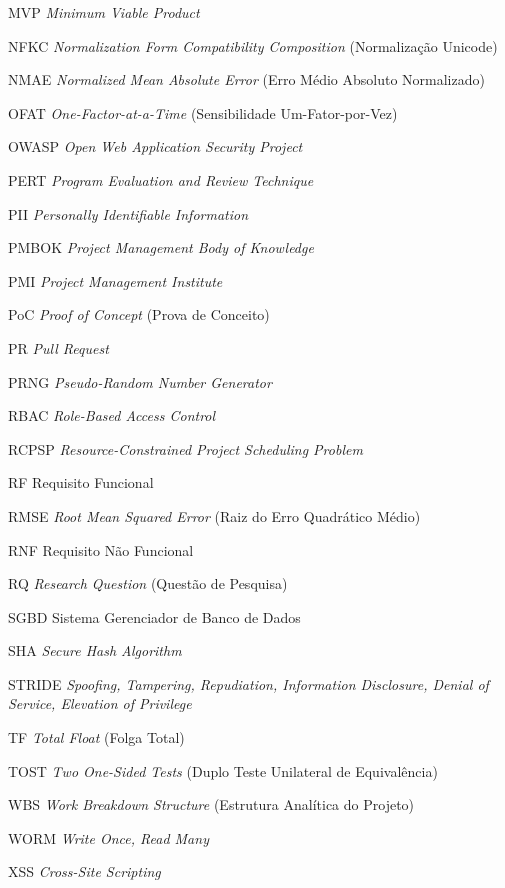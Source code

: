 \documentclass[12pt,openany,oneside,a4paper,english,brazilian,sumario=tradicional]{abntex2}
\begin{document}
\begin{siglas}
  \item[MVP] \textit{Minimum Viable Product}
  \item[NFKC] \textit{Normalization Form Compatibility Composition} (Normalização Unicode)
  \item[NMAE] \textit{Normalized Mean Absolute Error} (Erro Médio Absoluto Normalizado)
  \item[OFAT] \textit{One-Factor-at-a-Time} (Sensibilidade Um-Fator-por-Vez)
  \item[OWASP] \textit{Open Web Application Security Project}
  \item[PERT] \textit{Program Evaluation and Review Technique}
  \item[PII] \textit{Personally Identifiable Information}
  \item[PMBOK] \textit{Project Management Body of Knowledge}
  \item[PMI] \textit{Project Management Institute}
  \item[PoC] \textit{Proof of Concept} (Prova de Conceito)
  \item[PR] \textit{Pull Request}
  \item[PRNG] \textit{Pseudo-Random Number Generator}
  \item[RBAC] \textit{Role-Based Access Control}
  \item[RCPSP] \textit{Resource-Constrained Project Scheduling Problem}
  \item[RF] Requisito Funcional
  \item[RMSE] \textit{Root Mean Squared Error} (Raiz do Erro Quadrático Médio)
  \item[RNF] Requisito Não Funcional
  \item[RQ] \textit{Research Question} (Questão de Pesquisa)
  \item[SGBD] Sistema Gerenciador de Banco de Dados
  \item[SHA] \textit{Secure Hash Algorithm}
  \item[STRIDE] \textit{Spoofing, Tampering, Repudiation, Information Disclosure, Denial of Service, Elevation of Privilege}
  \item[TF] \textit{Total Float} (Folga Total)
  \item[TOST] \textit{Two One-Sided Tests} (Duplo Teste Unilateral de Equivalência)
  \item[WBS] \textit{Work Breakdown Structure} (Estrutura Analítica do Projeto)
  \item[WORM] \textit{Write Once, Read Many}
  \item[XSS] \textit{Cross-Site Scripting}
\end{siglas}
\end{document}
